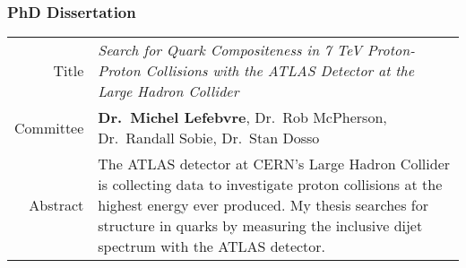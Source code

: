 \documentclass[12pt,a4paper]{article}
\begin{document}
\subsubsection*{PhD Dissertation}
\begin{tabular}{r p{14.3cm}}
	Title     & {\it Search for Quark Compositeness in 7 TeV Proton-Proton
							 Collisions with the ATLAS Detector at the Large Hadron
							 Collider} \\
	Committee & {\bf Dr.\ Michel Lefebvre}, Dr.\ Rob McPherson,
							 Dr.\ Randall Sobie, Dr.\ Stan Dosso \\
	Abstract  & {\small The ATLAS detector at CERN's Large Hadron Collider is
	             collecting data to investigate proton collisions at the highest
							 energy ever produced. My thesis searches for structure in quarks
							 by measuring the inclusive dijet spectrum with the ATLAS
							 detector.} \\
\end{tabular}



\end{document}
